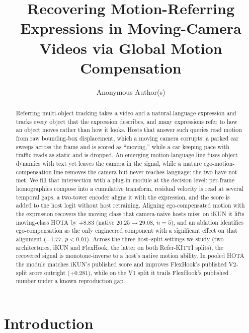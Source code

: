 \documentclass[sigconf,review,anonymous]{acmart}
\begin{document}
\title{Recovering Motion-Referring Expressions in Moving-Camera Videos via Global Motion Compensation}

\author{Anonymous Author(s)}

\begin{abstract}
Referring multi-object tracking takes a video and a natural-language expression and tracks every object that the expression describes, and many expressions refer to how an object moves rather than how it looks. Hosts that answer such queries read motion from raw bounding-box displacement, which a moving camera corrupts: a parked car sweeps across the frame and is scored as ``moving,'' while a car keeping pace with traffic reads as static and is dropped. An emerging motion-language line fuses object dynamics with text yet leaves the camera in the signal, while a mature ego-motion-compensation line removes the camera but never reaches language; the two have not met. We fill that intersection with a plug-in module at the decision level: per-frame homographies compose into a cumulative transform, residual velocity is read at several temporal gaps, a two-tower encoder aligns it with the expression, and the score is added to the host logit without host retraining. Aligning ego-compensated motion with the expression recovers the moving class that camera-naive hosts miss: on iKUN it lifts moving-class HOTA by $+8.83$ (native $20.25\!\to\!29.08$, $n{=}5$), and an ablation identifies ego-compensation as the only engineered component with a significant effect on that alignment ($-1.77$, $p{<}0.01$). Across the three host--split settings we study (two architectures, iKUN and FlexHook, the latter on both Refer-KITTI splits), the recovered signal is monotone-inverse to a host's native motion ability. In pooled HOTA the module matches iKUN's published score and improves FlexHook's published V2-split score outright ($+0.281$), while on the V1 split it trails FlexHook's published number under a known reproduction gap.
\end{abstract}


\maketitle

\section{Introduction}
\label{sec:intro}
\end{document}
